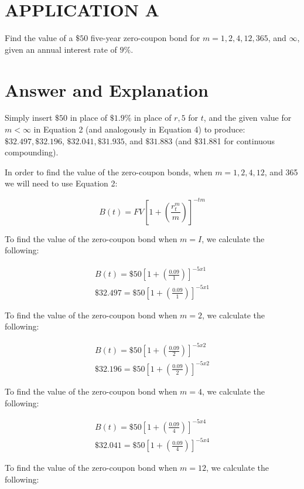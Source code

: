 \documentclass[11pt]{article}
\begin{document}
\section*{APPLICATION A}
Find the value of a $\$ 50$ five-year zero-coupon bond for $m=1,2,4,12,365$, and $\infty$, given an annual interest rate of $9 \%$.

\section*{Answer and Explanation}
Simply insert $\$ 50$ in place of $\$ 1.9 \%$ in place of $r, 5$ for $t$, and the given value for $m<\infty$ in Equation 2 (and analogously in Equation 4) to produce: $\$ 32.497, \$ 32.196$, $\$ 32.041, \$ 31.935$, and $\$ 31.883$ (and \$31.881 for continuous compounding).

In order to find the value of the zero-coupon bonds, when $m=1,2,4,12$, and 365 we will need to use Equation 2:

$$
B(t)=F V\left[1+\left(\frac{r_{t}^{m}}{m}\right)\right]^{-t m}
$$

To find the value of the zero-coupon bond when $m=I$, we calculate the following:

$$
\begin{gathered}
B(t)=\$ 50\left[1+\left(\frac{0.09}{1}\right)\right]^{-5 x 1} \\
\$ 32.497=\$ 50\left[1+\left(\frac{0.09}{1}\right)\right]^{-5 x 1}
\end{gathered}
$$

To find the value of the zero-coupon bond when $m=2$, we calculate the following:

$$
\begin{gathered}
B(t)=\$ 50\left[1+\left(\frac{0.09}{2}\right)\right]^{-5 x 2} \\
\$ 32.196=\$ 50\left[1+\left(\frac{0.09}{2}\right)\right]^{-5 x 2}
\end{gathered}
$$

To find the value of the zero-coupon bond when $m=4$, we calculate the following:

$$
\begin{gathered}
B(t)=\$ 50\left[1+\left(\frac{0.09}{4}\right)\right]^{-5 x 4} \\
\$ 32.041=\$ 50\left[1+\left(\frac{0.09}{4}\right)\right]^{-5 x 4}
\end{gathered}
$$

To find the value of the zero-coupon bond when $m=12$, we calculate the following:
\end{document}
